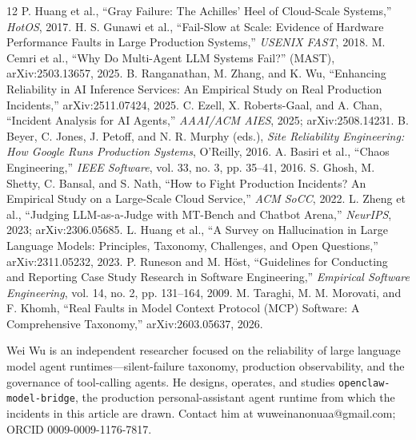 \documentclass[10pt,journal]{IEEEtran}
\begin{document}
\begin{thebibliography}{12}
 P. Huang et al., ``Gray Failure: The Achilles' Heel of
Cloud-Scale Systems,'' \emph{HotOS}, 2017.
 H. S. Gunawi et al., ``Fail-Slow at Scale: Evidence of Hardware
Performance Faults in Large Production Systems,'' \emph{USENIX FAST}, 2018.
 M. Cemri et al., ``Why Do Multi-Agent LLM Systems Fail?'' (MAST),
arXiv:2503.13657, 2025.
 B. Ranganathan, M. Zhang, and K. Wu, ``Enhancing Reliability in
AI Inference Services: An Empirical Study on Real Production Incidents,''
arXiv:2511.07424, 2025.
 C. Ezell, X. Roberts-Gaal, and A. Chan, ``Incident Analysis for
AI Agents,'' \emph{AAAI/ACM AIES}, 2025; arXiv:2508.14231.
 B. Beyer, C. Jones, J. Petoff, and N. R. Murphy (eds.),
\emph{Site Reliability Engineering: How Google Runs Production Systems},
O'Reilly, 2016.
 A. Basiri et al., ``Chaos Engineering,'' \emph{IEEE Software},
vol. 33, no. 3, pp. 35--41, 2016.
 S. Ghosh, M. Shetty, C. Bansal, and S. Nath, ``How to Fight
Production Incidents? An Empirical Study on a Large-Scale Cloud Service,''
\emph{ACM SoCC}, 2022.
 L. Zheng et al., ``Judging LLM-as-a-Judge with MT-Bench and
Chatbot Arena,'' \emph{NeurIPS}, 2023; arXiv:2306.05685.
 L. Huang et al., ``A Survey on Hallucination in Large Language
Models: Principles, Taxonomy, Challenges, and Open Questions,''
arXiv:2311.05232, 2023.
 P. Runeson and M. H\"ost, ``Guidelines for Conducting and
Reporting Case Study Research in Software Engineering,'' \emph{Empirical
Software Engineering}, vol. 14, no. 2, pp. 131--164, 2009.
 M. Taraghi, M. M. Morovati, and F. Khomh, ``Real Faults in
Model Context Protocol (MCP) Software: A Comprehensive Taxonomy,''
arXiv:2603.05637, 2026.
\end{thebibliography}

\begin{IEEEbiographynophoto}{Wei Wu}
is an independent researcher focused on the reliability of large language model
agent runtimes---silent-failure taxonomy, production observability, and the
governance of tool-calling agents. He designs, operates, and studies
\texttt{openclaw-model-bridge}, the production personal-assistant agent runtime
from which the incidents in this article are drawn. Contact him at
wuweinanonuaa@gmail.com; ORCID 0009-0009-1176-7817.
\end{IEEEbiographynophoto}
\end{document}
